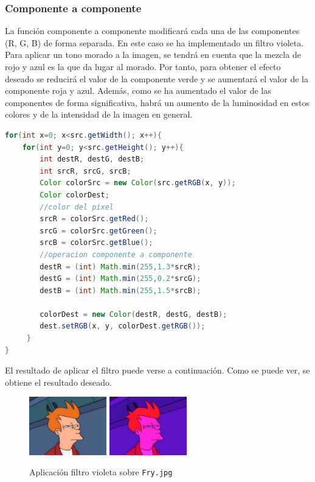 \subsubsection{Componente a componente}
La función componente a componente modificará cada una de las componentes (R, G, B) de forma separada.\vskip0.3cm
En este caso se ha implementado un filtro violeta. Para aplicar un tono morado a la imagen, se tendrá en cuenta que la mezcla de rojo y azul es la que da lugar al morado. Por tanto, para obtener el efecto deseado se reducirá el valor de la componente verde y se aumentará el valor de la componente roja y azul.
\vskip0.3cm
Además, como se ha aumentado el valor de las componentes de forma significativa, habrá un aumento de la luminosidad en estos colores y de la intensidad de la imagen en general.
\vskip0.3cm
\begin{lstlisting}[language=Java, caption=Operación componente a componente, label=lst:graddesc]
for(int x=0; x<src.getWidth(); x++){
    for(int y=0; y<src.getHeight(); y++){
        int destR, destG, destB;
        int srcR, srcG, srcB;
        Color colorSrc = new Color(src.getRGB(x, y));
        Color colorDest;
        //color del pixel
        srcR = colorSrc.getRed();
        srcG = colorSrc.getGreen();
        srcB = colorSrc.getBlue();
        //operacion componente a componente
        destR = (int) Math.min(255,1.3*srcR);
        destG = (int) Math.min(255,0.2*srcG);
        destB = (int) Math.min(255,1.5*srcB);
                
        colorDest = new Color(destR, destG, destB);
        dest.setRGB(x, y, colorDest.getRGB());
     }
}
\end{lstlisting}
El resultado de aplicar el filtro puede verse a continuación. Como se puede ver, se obtiene el resultado deseado.
\vskip0.3cm
\begin{figure}[H]
 \centering
  \includegraphics[width=0.3\textwidth]{imagenes/Fry.jpg}
  \includegraphics[width=0.3\textwidth]{imagenes/fryVioleta.jpg}
 \caption{Aplicación filtro violeta sobre \texttt{Fry.jpg}}
 \label{diseño}
 \end{figure}


